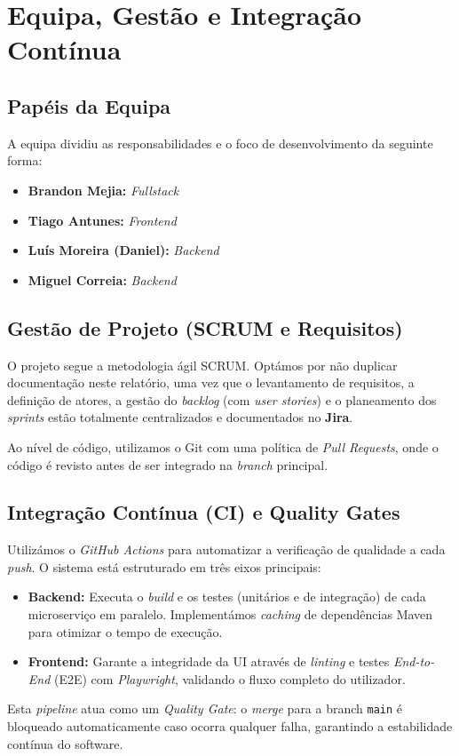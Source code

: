 
\newpage
\section{Equipa, Gestão e Integração Contínua}

\subsection{Papéis da Equipa}
A equipa dividiu as responsabilidades e o foco de desenvolvimento da seguinte forma:
\begin{itemize}[nosep]
    \item \textbf{Brandon Mejia:} \textit{Fullstack}
    \item \textbf{Tiago Antunes:} \textit{Frontend}
    \item \textbf{Luís Moreira (Daniel):} \textit{Backend}
    \item \textbf{Miguel Correia:} \textit{Backend}
\end{itemize}

\subsection{Gestão de Projeto (SCRUM e Requisitos)}
O projeto segue a metodologia ágil SCRUM. Optámos por não duplicar documentação neste relatório, uma vez que o levantamento de requisitos, a definição de atores, a gestão do \textit{backlog} (com \textit{user stories}) e o planeamento dos \textit{sprints} estão totalmente centralizados e documentados no \textbf{Jira}.

Ao nível de código, utilizamos o Git com uma política de \textit{Pull Requests}, onde o código é revisto antes de ser integrado na \textit{branch} principal.

\subsection{Integração Contínua (CI) e Quality Gates}
Utilizámos o \textit{GitHub Actions} para automatizar a verificação de qualidade a cada \textit{push}. O sistema está estruturado em três eixos principais:

\begin{itemize}[nosep]
\item \textbf{Backend:} Executa o \textit{build} e os testes (unitários e de integração) de cada microserviço em paralelo. Implementámos \textit{caching} de dependências Maven para otimizar o tempo de execução.
\item \textbf{Frontend:} Garante a integridade da UI através de \textit{linting} e testes \textit{End-to-End} (E2E) com \textit{Playwright}, validando o fluxo completo do utilizador.

\end{itemize}

Esta \textit{pipeline} atua como um \textit{Quality Gate}: o \textit{merge} para a branch \texttt{main} é bloqueado automaticamente caso ocorra qualquer falha, garantindo a estabilidade contínua do software.